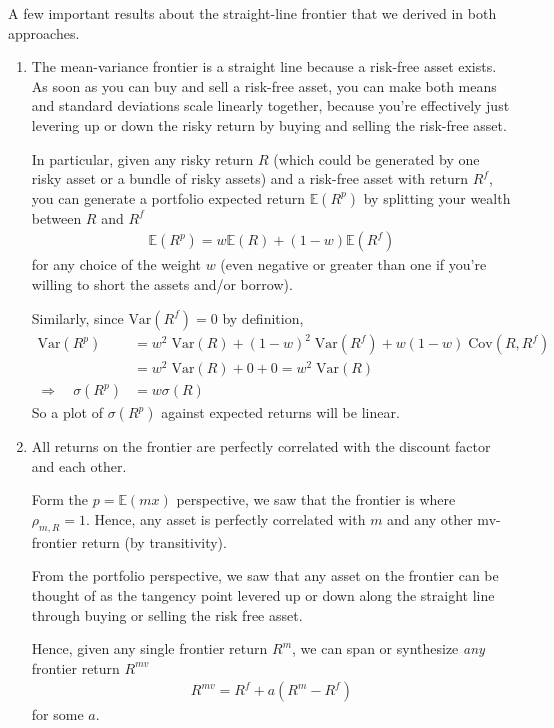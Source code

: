 \documentclass[a4paper,12pt]{scrartcl}
\begin{document}
A few important results about the straight-line frontier that we derived
in both approaches.
\begin{enumerate}
  \item The mean-variance frontier is a straight line because a
    risk-free asset exists. As soon as you can buy and sell a risk-free
    asset, you can make both means and standard deviations scale
    linearly together, because you're effectively just levering up or
    down the risky return by buying and selling the risk-free asset.

    In particular, given any risky return $R$ (which could be generated
    by one risky asset or a bundle of risky assets) and a risk-free
    asset with return $R^f$, you can generate a portfolio expected
    return $\mathbb{E}(R^p)$ by splitting your wealth between $R$ and
    $R^f$
    \begin{align*}
      \mathbb{E}(R^p) = w \mathbb{E}(R) + (1-w) \mathbb{E}(R^f)
    \end{align*}
    for any choice of the weight $w$ (even negative or greater than one
    if you're willing to short the assets and/or borrow).

    Similarly, since $\text{Var}(R^f)=0$ by definition,
    \begin{align*}
      \text{Var}(R^p)
      &= w^2 \; \text{Var}(R) + (1-w)^2 \; \text{Var}(R^f)
      + w(1-w)\; \text{Cov}(R,R^f)\\
      &= w^2 \; \text{Var}(R) + 0 + 0 = w^2\;\text{Var}(R)\\
      \Rightarrow \quad
      \sigma(R^p) &= w \sigma(R)
    \end{align*}
    So a plot of $\sigma(R^p)$ against expected returns will be linear.

  \item All returns on the frontier are perfectly correlated with the
    discount factor and each other.

    Form the $p=\mathbb{E}(mx)$ perspective, we saw that the frontier is
    where $\rho_{m,R}=1$. Hence, any asset is perfectly correlated with
    $m$ and any other mv-frontier return (by transitivity).

    From the portfolio perspective, we saw that any asset on the
    frontier can be thought of as the tangency point levered up or down
    along the straight line through buying or selling the risk free
    asset.

    Hence, given any single frontier return $R^m$, we can span or
    synthesize \emph{any} frontier return $R^{mv}$
    \begin{align*}
      R^{mv} = R^f + a(R^m-R^f)
    \end{align*}
    for some $a$.


\end{enumerate}
\end{document}
